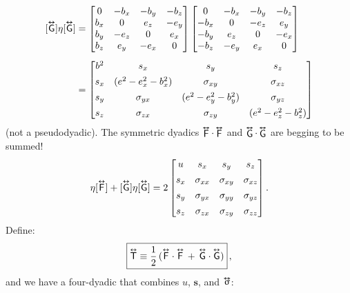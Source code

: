 \documentclass[12pt]{article}
\renewcommand{\vv}[1]{\mathbf{#1}}
\newcommand{\tightoverset}[2]{%
  \mathop{#2}\limits^{\vbox to -.5ex{\kern-0.75ex\hbox{$#1$}\vss}}}
\newcommand{\inlinedy}[1]{\tightoverset{\text{\tiny$\bm\leftrightarrow$}}{#1}}
\newcommand{\capdy}[1]{ \overset{ \text{\tiny$\bm\leftrightarrow$} }{\vphantom{\text{\small{A}}}\smash{#1}} }
\begin{document}
\begin{equation*}
\begin{aligned}
\mkern0mu [\capdy{\mathsf{G}}] \eta [\capdy{\mathsf{G}}]
&=
\begin{bmatrix}
0 & -b_x & -b_y & -b_z \\
b_x & 0 & e_z & -e_y \\
b_y & -e_z & 0 & e_x \\
b_z & e_y & -e_x & 0
\end{bmatrix}
\begin{bmatrix}
0 & -b_x & -b_y & -b_z \\
-b_x & 0 & -e_z & e_y \\
-b_y & e_z & 0 & -e_x \\
-b_z & -e_y & e_x & 0
\end{bmatrix} \\[5pt]
&=
\begin{bmatrix}
b^2 & s_x & s_y & s_z \\[1ex]
s_x & (e^2 - e_x^2 - b_x^2) & \sigma_{x y} & \sigma_{x z} \\[1ex]
s_y & \sigma_{y x} & (e^2 - e_y^2 - b_y^2)  & \sigma_{y z} \\[1ex]
s_z & \sigma_{z x} & \sigma_{z y} & (e^2 - e_z^2 - b_z^2) 
\end{bmatrix}
\end{aligned}
\end{equation*}
(not a pseudodyadic). The symmetric dyadics $\inlinedy{\mathsf{F}} \cdot \inlinedy{\mathsf{F}}$ and $\inlinedy{\mathsf{G}} \cdot \inlinedy{\mathsf{G}}$ are begging to be summed!
\begin{equation*}
[\capdy{\mathsf{F}}] \eta [\capdy{\mathsf{F}}] + [\capdy{\mathsf{G}}] \eta [\capdy{\mathsf{G}}]
= 2
\begin{bmatrix}
 u &  s_x &  s_y &  s_z \\[1ex]
 s_x &  \sigma_{x x} &  \sigma_{x y} &  \sigma_{x z} \\[1ex]
 s_y &  \sigma_{y x} &  \sigma_{yy}  &  \sigma_{y z} \\[1ex]
 s_z &  \sigma_{z x} &  \sigma_{z y} &  \sigma_{zz}
\end{bmatrix}.
\end{equation*}
Define:
\begin{equation}\label{eq:eset}
\boxed { \capdy{\mathsf{T}} \equiv \dfrac{1}{2} \, ( \capdy{\mathsf{F}} \cdot \capdy{\mathsf{F}} \, + \, \capdy{\mathsf{G}} \cdot \capdy{\mathsf{G}} ) } \, ,
\end{equation}
and we have a four-dyadic that combines $u$, $\vv s$, and $\inlinedy{\upsigma}$:
\end{document}
